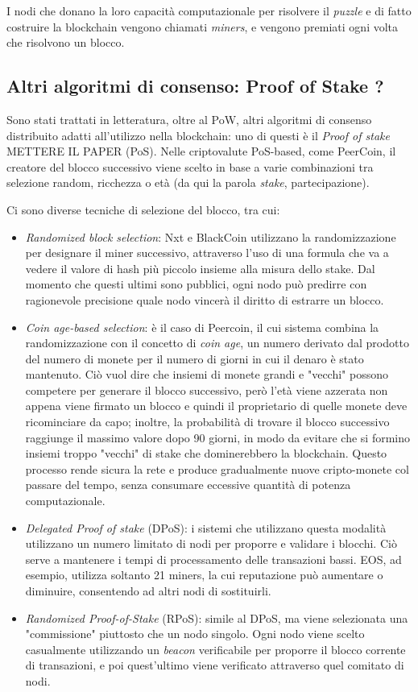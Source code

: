 I nodi che donano la loro capacità computazionale per risolvere il \textit{puzzle} e di fatto costruire la blockchain vengono chiamati \textit{miners}, e vengono premiati ogni volta che risolvono un blocco.


\subsection{Altri algoritmi di consenso: Proof of Stake ? }
\label{c:tec:bitcoin:pow}

Sono stati trattati in letteratura, oltre al PoW, altri algoritmi di consenso distribuito adatti all'utilizzo nella blockchain: uno di questi è il \textit{Proof of stake} METTERE IL PAPER (PoS)\cite{}. Nelle criptovalute PoS-based, come PeerCoin, il creatore del blocco successivo viene scelto in base a varie combinazioni tra selezione random, ricchezza o età (da qui la parola \textit{stake}, partecipazione).

Ci sono diverse tecniche di selezione del blocco, tra cui:

\begin{itemize}
    \item \textit{Randomized block selection}: Nxt e BlackCoin utilizzano la randomizzazione per designare il miner successivo, attraverso l'uso di una formula che va a vedere il valore di hash più piccolo insieme alla misura dello stake. Dal momento che questi ultimi sono pubblici, ogni nodo può predirre con ragionevole precisione quale nodo vincerà il diritto di estrarre un blocco.
    \item \textit{Coin age-based selection}: è il caso di Peercoin, il cui sistema combina la randomizzazione con il concetto di \textit{coin age}, un numero derivato dal prodotto del numero di monete per il numero di giorni in cui il denaro è stato mantenuto. Ciò vuol dire che insiemi di monete grandi e "vecchi" possono competere per generare il blocco successivo, però l'età viene azzerata non appena viene firmato un blocco e quindi il proprietario di quelle monete deve ricominciare da capo; inoltre, la probabilità di trovare il blocco successivo raggiunge il massimo valore dopo 90 giorni, in modo da evitare che si formino insiemi troppo "vecchi" di stake che dominerebbero la blockchain. Questo processo rende sicura la rete e produce gradualmente nuove cripto-monete col passare del tempo, senza consumare eccessive quantità di potenza computazionale. 
    \item \textit{Delegated Proof of stake} (DPoS): i sistemi che utilizzano questa modalità utilizzano un numero limitato di nodi per proporre e validare i blocchi. Ciò serve a mantenere i tempi di processamento delle transazioni bassi. EOS, ad esempio, utilizza soltanto 21 miners, la cui reputazione può aumentare o diminuire, consentendo ad altri nodi di sostituirli. 
    \item \textit{Randomized Proof-of-Stake} (RPoS): simile al DPoS, ma viene selezionata una "commissione" piuttosto che un nodo singolo. Ogni nodo viene scelto casualmente utilizzando un \textit{beacon} verificabile per proporre il blocco corrente di transazioni, e poi quest'ultimo viene verificato attraverso quel comitato di nodi.
\end{itemize}
